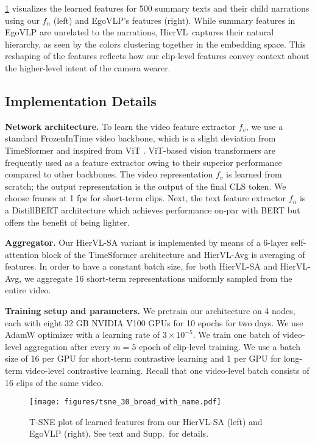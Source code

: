 \documentclass[10pt,twocolumn,letterpaper]{article}
\newcommand{\modelname}[0]{{HierVL}}
\begin{document}
\cref{fig:tsne} visualizes the learned features for 500 summary texts and their child narrations using our $f_n$ (left) and EgoVLP's features (right).  
While summary features in EgoVLP are unrelated to the  narrations, 
\modelname~captures their natural hierarchy, as seen by the colors clustering together in the embedding space. 
This reshaping of the features reflects how our clip-level features convey context about the higher-level intent of the camera wearer.





\subsection{Implementation Details}
\label{sec:impl}

\noindent \textbf{Network architecture.} To learn the video feature extractor $f_v$, we use a standard FrozenInTime \cite{frozenintime} video backbone, which is a slight deviation from TimeSformer \cite{timesformer} and inspired from ViT \cite{vit}. ViT-based vision transformers are frequently used as a feature extractor \cite{egovlp,clip} owing to their superior performance compared to other backbones. The video representation $f_v$ is learned from scratch; the output representation is the output of the final CLS token. We choose frames at 1 fps for short-term clips.
Next, the text feature extractor $f_n$ is a DistillBERT \cite{distilbert} architecture which achieves performance on-par with BERT \cite{bert} but offers the benefit of being lighter. 

\noindent \textbf{Aggregator.}  Our HierVL-SA variant is implemented by means of a 6-layer self-attention block of the TimeSformer architecture \cite{timesformer} and \modelname-Avg is averaging of features. In order to have a constant batch size, for both HierVL-SA and HierVL-Avg, we aggregate 16 short-term representations uniformly sampled from the entire video. 


\noindent \textbf{Training setup and parameters.} We pretrain our architecture on 4 nodes, each with eight 32 GB NVIDIA V100 GPUs for 10 epochs for two days. We use AdamW \cite{adamw} optimizer with a learning rate of $3\times10^{-5}$. We train one batch of video-level aggregation after every $m=5$ epoch of clip-level training. 
We use a batch size of 16 per GPU for short-term contrastive learning and 1 per GPU for long-term video-level contrastive learning. Recall that one video-level batch consists of 16 clips of the same video.
 \begin{figure}[t]
\centering
\texttt{[image: figures/tsne\_30\_broad\_with\_name.pdf]}
\caption{T-SNE plot of learned features from our \modelname-SA (left) and EgoVLP \cite{egovlp} (right).  See text and Supp.~for details.}

\label{fig:tsne}
\vspace{-0.10in}
\end{figure}
\end{document}
